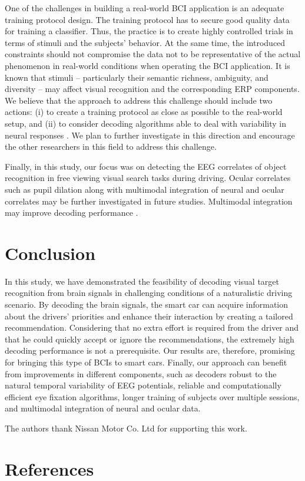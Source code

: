 \documentclass[12pt]{iopart}
\begin{document}
One of the challenges in building a real-world BCI application is an adequate
training protocol design. The training protocol has to secure good quality data
for training a classifier. Thus, the practice is to create highly controlled
trials in terms of stimuli and the subjects’ behavior.
At the same time, the introduced constraints should not 
compromise the data not to be representative of the actual 
phenomenon in real-world conditions when operating 
the BCI application. It is known that stimuli -- particularly
their semantic richness, ambiguity, and diversity -- may
affect visual recognition and the corresponding ERP
components. We believe that the approach to address
this challenge should include two actions: (i) to create a
training protocol as close as possible to the real-world
setup, and (ii) to consider decoding algorithms able
to deal with variability in neural responses
\cite{aydarkhanov_spatial_2020}. We plan to further investigate
in this direction and encourage the other researchers
in this field to address this challenge.



Finally, in this study, our focus was on detecting the EEG correlates of object recognition in free viewing visual search tasks during driving. Ocular correlates such as pupil dilation along with multimodal
integration of neural and ocular correlates may be further investigated
in future studies.
Multimodal integration may improve decoding performance \cite{jangraw_neurally_2014}.


\section{Conclusion}
\label{sec:conclusion}

In this study, we have demonstrated the feasibility of decoding
visual target recognition from brain signals in 
challenging conditions of a naturalistic driving scenario. 
By decoding the brain signals, the smart car can acquire information about
the drivers’ priorities and enhance their interaction by
creating a tailored recommendation.
Considering that no extra effort is required from
the driver and that he could quickly accept or ignore
the recommendations, the extremely high decoding performance
is not a prerequisite. Our results are, therefore,
promising for bringing this type of BCIs to smart cars.
Finally, our approach can benefit from improvements in
different components, such as decoders robust to the natural
temporal variability of EEG potentials, reliable and
computationally efficient eye fixation algorithms,
longer training of subjects over multiple sessions,
and multimodal integration of neural and ocular data.


\ack

The authors thank Nissan Motor Co. Ltd for supporting
this work.

\section*{References}



\end{document}
